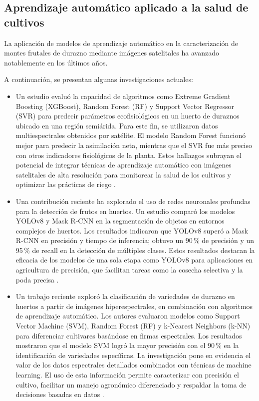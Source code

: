 \subsection{Aprendizaje automático aplicado a la salud de cultivos}

La aplicación de modelos de aprendizaje automático en la caracterización de 
montes frutales de durazno mediante imágenes satelitales ha avanzado 
notablemente en los últimos años.

A continuación, se presentan algunas investigaciones actuales: 
\begin{itemize}
  \item Un estudio evaluó la capacidad de algoritmos como Extreme Gradient Boosting (XGBoost),
   Random Forest (RF) y Support Vector Regressor (SVR) para predecir parámetros ecofisiológicos en un huerto de
   duraznos ubicado en una región semiárida. Para este fin, se utilizaron datos multiespectrales obtenidos por satélite.
   El modelo Random Forest funcionó mejor para predecir la asimilación neta, mientras que el SVR fue más preciso con otros indicadores 
   fisiológicos de la planta. Estos hallazgos subrayan el potencial de integrar técnicas de aprendizaje automático 
   con imágenes satelitales de alta resolución para monitorear la salud de los cultivos y optimizar las prácticas
   de riego \citep{Campi2024}.
  \item Una contribución reciente ha explorado el uso de redes neuronales profundas para la detección de frutos en huertos.
   Un estudio comparó los modelos YOLOv8 y Mask R-CNN en la segmentación de objetos en entornos complejos de huertos. Los resultados indicaron que
   YOLOv8 superó a Mask R-CNN en precisión y tiempo de inferencia; obtuvo un 90\,\% de precisión y un 95\,\% de recall  
   en la detección de múltiples clases. Estos resultados destacan la eficacia de los modelos de una sola etapa como YOLOv8 para 
   aplicaciones en agricultura de precisión, que facilitan tareas como la cosecha selectiva y la poda precisa \citep{Sapkota2023}.
  \item Un trabajo reciente exploró la clasificación de variedades de durazno en huertos a partir de imágenes hiperespectrales, en combinación 
  con algoritmos de aprendizaje automático. Los autores evaluaron modelos como Support Vector Machine (SVM), Random Forest (RF) 
  y k-Nearest Neighbors (k-NN) para diferenciar cultivares basándose en firmas espectrales. Los resultados mostraron que el modelo 
  SVM logró la mayor precisión con el 90\,\% en la identificación de variedades específicas. La investigación pone en evidencia el valor 
  de los datos espectrales detallados combinados con técnicas de machine learning. El uso de esta información permite caracterizar con 
  precisión el cultivo, facilitar un manejo agronómico diferenciado y respaldar la toma de decisiones basadas en datos \citep{Zhou2022}.
\end{itemize}


